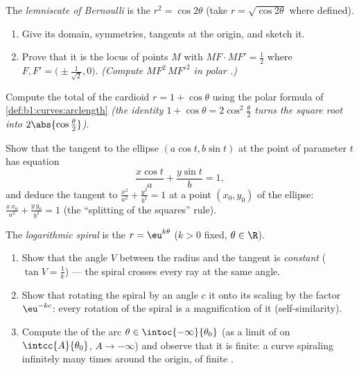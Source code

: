\begin{exercise}[$\star\star\star$]\label{exo:b1:curves:9}
The \emph{lemniscate of Bernoulli} is the  $r^2 = \cos
2\theta$ (take $r = \sqrt{\cos2\theta}$ where defined).
\begin{enumerate}
  \item Give its domain, symmetries, tangents at the origin, and
        sketch it.
  \item Prove that it is the locus of points $M$ with $MF \cdot MF'
        = \frac12$ where $F, F' = \bigl(\pm\frac{1}{\sqrt2},
        0\bigr)$. \emph{(Compute $MF^2\,MF'^2$ in polar
        .)}
\end{enumerate}
\end{exercise}

\begin{exercise}[$\star\star$]\label{exo:b1:curves:10}
Compute the total  of the cardioid $r = 1 + \cos\theta$
using the polar formula of \cref{def:b1:curves:arclength}
\emph{(the identity $1 + \cos\theta = 2\cos^2\frac\theta2$ turns
the square root into $2\abs{\cos\frac\theta2}$)}.
\end{exercise}

\begin{exercise}[$\star\star$]\label{exo:b1:curves:11}
Show that the tangent to the ellipse $(a\cos t, b\sin t)$ at the
point of parameter $t$ has equation
\[
\frac{x\cos t}{a} + \frac{y\sin t}{b} = 1 ,
\]
and deduce the tangent to $\frac{x^2}{a^2} + \frac{y^2}{b^2} = 1$
at a point $(x_0, y_0)$ of the ellipse: $\frac{x\,x_0}{a^2} +
\frac{y\,y_0}{b^2} = 1$ (the ``splitting of the squares'' rule).
\end{exercise}

\begin{exercise}[$\star\star\star$]\label{exo:b1:curves:12}
The \emph{logarithmic spiral} is the  $r =
\eu^{k\theta}$ ($k > 0$ fixed, $\theta \in \R$).
\begin{enumerate}
  \item Show that the angle $V$ between the radius and the
        tangent is \emph{constant} ($\tan V = \frac1k$) --- the
        spiral crosses every ray at the same angle.
  \item Show that rotating the spiral by an angle $c$  it
        onto its scaling by the factor $\eu^{-kc}$: every
        rotation of the spiral is a magnification of it
        (self-similarity).
  \item Compute the  of the arc $\theta \in
        \intoc{-\infty}{\theta_0}$ (as a limit of  on
        $\intcc{A}{\theta_0}$, $A \to -\infty$) and observe that
        it is finite: a curve spiraling infinitely many times
        around the origin, of finite .
\end{enumerate}
\end{exercise}

